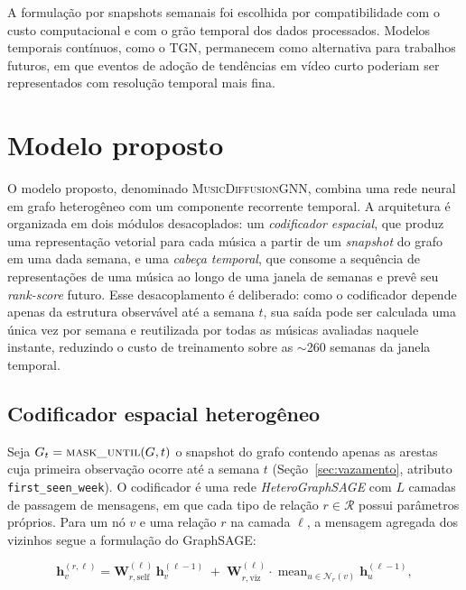 A formulação por snapshots semanais foi escolhida por compatibilidade com o custo computacional e com o grão temporal dos dados processados. Modelos temporais contínuos, como o TGN, permanecem como alternativa para trabalhos futuros, em que eventos de adoção de tendências em vídeo curto poderiam ser representados com resolução temporal mais fina.


\section{Modelo proposto}
\label{sec:modelo-proposto}

O modelo proposto, denominado \textsc{MusicDiffusionGNN}, combina uma rede neural em grafo heterogêneo com um componente recorrente temporal. A arquitetura é organizada em dois módulos desacoplados: um \emph{codificador espacial}, que produz uma representação vetorial para cada música a partir de um \emph{snapshot} do grafo em uma dada semana, e uma \emph{cabeça temporal}, que consome a sequência de representações de uma música ao longo de uma janela de semanas e prevê seu \emph{rank-score} futuro. Esse desacoplamento é deliberado: como o codificador depende apenas da estrutura observável até a semana $t$, sua saída pode ser calculada uma única vez por semana e reutilizada por todas as músicas avaliadas naquele instante, reduzindo o custo de treinamento sobre as $\sim$260 semanas da janela temporal.

\subsection{Codificador espacial heterogêneo}

Seja $G_t = \textsc{mask\_until}(G, t)$ o snapshot do grafo contendo apenas as arestas cuja primeira observação ocorre até a semana $t$ (Seção~\ref{sec:vazamento}, atributo \texttt{first\_seen\_week}). O codificador é uma rede \emph{HeteroGraphSAGE} \citep{hamilton2017graphsage} com $L$ camadas de passagem de mensagens, em que cada tipo de relação $r \in \mathcal{R}$ possui parâmetros próprios. Para um nó $v$ e uma relação $r$ na camada $\ell$, a mensagem agregada dos vizinhos segue a formulação do GraphSAGE:

\begin{equation}
\label{eq:sage-rel}
\mathbf{h}_v^{(r,\ell)} = \mathbf{W}^{(\ell)}_{r,\text{self}}\,\mathbf{h}_v^{(\ell-1)}
  \;+\; \mathbf{W}^{(\ell)}_{r,\text{viz}} \cdot \operatorname{mean}_{u \in \mathcal{N}_r(v)} \mathbf{h}_u^{(\ell-1)},
\end{equation}

